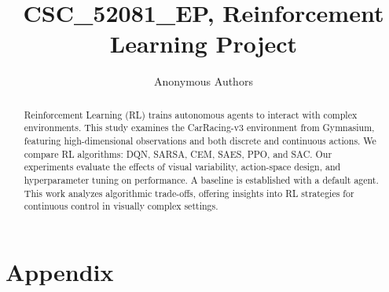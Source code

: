 \documentclass[journal, a4paper]{IEEEtran}
\begin{document}
\title{CSC\_52081\_EP, Reinforcement Learning Project}
\author{Anonymous Authors}
\maketitle

\begin{abstract}
    Reinforcement Learning (RL) trains autonomous agents to interact with complex environments. This study examines the CarRacing-v3 environment from Gymnasium, featuring high-dimensional observations and both discrete and continuous actions. We compare RL algorithms: DQN, SARSA, CEM, SAES, PPO, and SAC. Our experiments evaluate the effects of visual variability, action-space design, and hyperparameter tuning on performance. A baseline is established with a default agent. This work analyzes algorithmic trade-offs, offering insights into RL strategies for continuous control in visually complex settings.
\end{abstract}







\newpage
\section*{Appendix}
\end{document}
